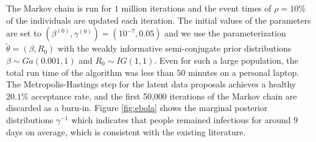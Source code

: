 \documentclass[12pt]{article}
\begin{document}
	The Markov chain is run for $1$ million iterations and the event times of $\rho=10\%$ of the individuals are updated each iteration. The initial values of the parameters are set to $(\beta^{(0)}, \gamma^{(0)}) = (10^{-7}, 0.05)$ and we use the parameterization $\tilde{\theta} = (\beta, R_0)$ with the weakly informative semi-conjugate prior distributions $\beta \sim Ga(0.001, 1)$ and $R_0 \sim IG(1,1)$. Even for such a large population, the total run time of the algorithm was less than $50$ minutes on a personal laptop.
	The Metropolis-Hastings step for the latent data proposals achieves a healthy $20.1\%$ acceptance rate, and the first 50,000 iterations of the Markov chain are discarded as a burn-in.
	Figure \ref{fig:ebola} shows the marginal posterior distributions $\gamma^{-1}$ which indicates that people remained infectious for around $9$ days on average, which is consistent with the existing literature.
	
\end{document}
